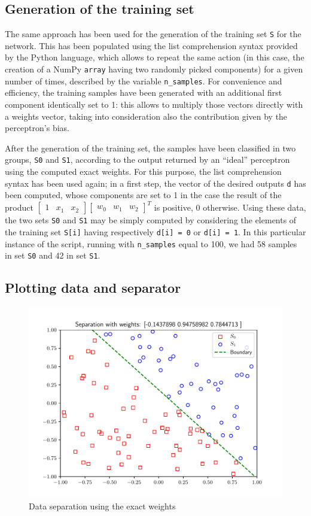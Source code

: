 \documentclass[letterpaper,headings=standardclasses]{scrartcl}
\begin{document}
\subsection{Generation of the training set}

The same approach has been used for the generation of the training set \texttt{S} for the network. This has been populated using the list comprehension syntax provided by the Python language, which allows to repeat the same action (in this case, the creation of a NumPy \texttt{array} having two randomly picked components) for a given number of times, described by the variable \texttt{n\_samples}. For convenience and efficiency, the training samples have been generated with an additional first component identically set to 1: this allows to multiply those vectors directly with a weights vector, taking into consideration also the contribution given by the perceptron's bias.

After the generation of the training set, the samples have been classified in two groups, \texttt{S0} and \texttt{S1}, according to the output returned by an “ideal” perceptron using the computed exact weights. For this purpose, the list comprehension syntax has been used again; in a first step, the vector of the desired outputs \texttt{d} has been computed, whose components are set to 1 in the case the result of the product $[ \begin{matrix}1 & x_1 & x_2 \end{matrix}][\begin{matrix} w_0 & w_1 & w_2 \end{matrix}]^T$ is positive, 0 otherwise. Using these data, the two sets \texttt{S0} and \texttt{S1} may be simply computed by considering the elements of the training set \texttt{S[i]} having respectively \texttt{d[i] = 0} or \texttt{d[i] = 1}. In this particular instance of the script, running with \texttt{n\_samples} equal to 100, we had 58 samples in set \texttt{S0} and 42 in set \texttt{S1}.

\subsection{Plotting data and separator}

\begin{figure}[h]
\centering
\includegraphics[width=.7\linewidth]{exact_sep.pdf}
\caption{Data separation using the exact weights}
\label{exact_sep}
\end{figure}
\end{document}

